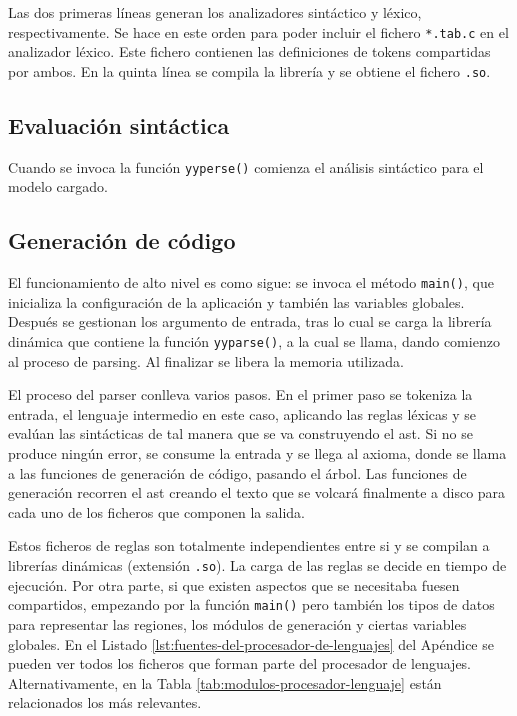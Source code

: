Las dos primeras líneas generan los analizadores sintáctico y léxico, respectivamente. Se hace en este orden para poder incluir el fichero \verb|*.tab.c| en el analizador léxico. Este fichero contienen las definiciones de tokens compartidas por ambos. En la quinta línea se compila la librería y se obtiene el fichero \verb|.so|.

\subsection{Evaluación sintáctica}

Cuando se invoca la función \verb|yyperse()| comienza el análisis sintáctico para el modelo cargado.

\subsection{Generación de código}


El funcionamiento de alto nivel es como sigue: se invoca el método \verb|main()|, que inicializa la configuración de la aplicación y también las variables globales. Después se gestionan los argumento de entrada, tras lo cual se carga la librería dinámica que contiene la función \verb|yyparse()|, a la cual se llama, dando comienzo al proceso de parsing. Al finalizar se libera la memoria utilizada.

El proceso del parser conlleva varios pasos. En el primer paso se tokeniza la entrada, el lenguaje intermedio en este caso, aplicando las reglas léxicas y se evalúan las sintácticas de tal manera que se va construyendo el \acrlong{ast}. Si no se produce ningún error, se consume la entrada y se llega al axioma, donde se llama a las funciones de generación de código, pasando el árbol. Las funciones de generación recorren el \acrshort{ast} creando el texto que se volcará finalmente a disco para cada uno de los ficheros que componen la salida.


Estos ficheros de reglas son totalmente independientes entre si y se compilan a librerías dinámicas (extensión \verb|.so|). La carga de las reglas se decide en tiempo de ejecución. Por otra parte, si que existen aspectos que se necesitaba fuesen compartidos, empezando por la función \verb|main()| pero también los tipos de datos para representar las regiones, los módulos de generación y ciertas variables globales. En el Listado \ref{lst:fuentes-del-procesador-de-lenguajes} del Apéndice se pueden ver todos los ficheros que forman parte del procesador de lenguajes. Alternativamente, en la Tabla \ref{tab:modulos-procesador-lenguaje} están relacionados los más relevantes.


